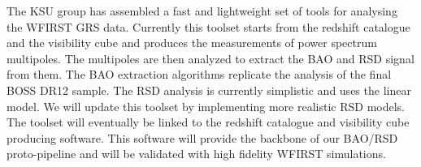  The KSU group has assembled a fast and lightweight set of tools for analysing
 the WFIRST GRS data. Currently this toolset starts from the redshift catalogue
 and the visibility cube and produces the measurements of power spectrum
 multipoles. The multipoles are then analyzed to extract the BAO and RSD signal
 from them. The BAO extraction algorithms replicate the analysis of the final
 BOSS DR12 sample. The RSD analysis is currently simplistic and uses the linear
 model. We will update this toolset by implementing more realistic RSD models.
 The toolset will eventually be linked to the redshift catalogue and visibility
 cube producing software. This software will provide the backbone of our BAO/RSD
 proto-pipeline and will be validated with high fidelity WFIRST simulations.





